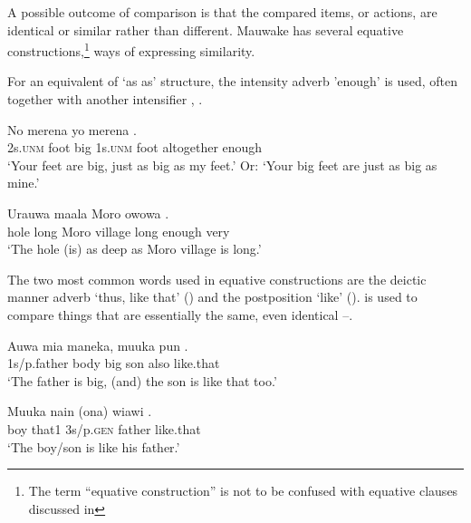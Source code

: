 A possible outcome of comparison is that the compared items, or actions, are identical or similar rather than different. Mauwake has several equative constructions,\footnote{ The term ``equative construction'' is not to be confused with equative clauses discussed in } ways of expressing similarity. 

For an equivalent of  `as  as' structure, the intensity adverb  'enough' is used, often together with another intensifier , .

\ea%
\label{ex:6:x1331}
\gll No  merena    yo  merena    . \\
2s.\textsc{unm}  foot  big  1s.\textsc{unm}  foot  altogether  enough\\
\glt `Your feet are big, just as big as my feet.' Or: `Your big feet are just as big as mine.'
\z

\ea%
\label{ex:6:x1332}
\gll Urauwa  maala  Moro  owowa      . \\
hole  long  Moro  village  long  enough  very\\
\glt `The hole (is) as deep as Moro village is long.'
\z

The two most common words used in equative constructions are the deictic manner adverb  `thus, like that' () and the postposition  `like' ().  is used to compare things that are essentially the same, even identical --.

\ea%
\label{ex:6:x1338}
\gll Auwa  mia  maneka,  muuka  pun  . \\
1s/p.father  body  big  son  also  like.that\\
\glt `The father is big, (and) the son is like that too.'
\z

\ea%
\label{ex:6:x1339}
\gll Muuka  nain  (ona)  wiawi  . \\
boy  that1  3s/p.\textsc{gen}  father  like.that\\
\glt `The boy/son is like his father.'
\z


